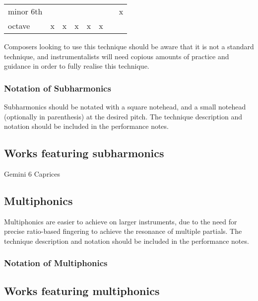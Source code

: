 \begin{table}[]
{\begin{tabular}{llllllll}
    minor 6th                                                                                             &                         &                       &                       &                       &                       &                       & x                     \\
    octave                                                                                                & x                       & x                     & x                     & x                     & x                     &                       &                      
    \end{tabular}%
    }
    \end{table}

Composers looking to use this technique should be aware that it is not a standard technique, and instrumentalists will need copious amounts of practice and guidance in order to fully realise this technique.

\subsubsection{Notation of Subharmonics}
Subharmonics should be notated with a square notehead, and a small notehead (optionally in parenthesis) at the desired pitch.
The technique description and notation should be included in the performance notes.

\subsection{Works featuring subharmonics}
Gemini 
6 Caprices

\subsection{Multiphonics}
Multiphonics are easier to achieve on larger instruments, due to the need for precise ratio-based fingering to achieve the resonance of multiple partials.
The technique description and notation should be included in the performance notes.
\lipsum[4]

\subsubsection{Notation of Multiphonics}

\subsection{Works featuring multiphonics}

